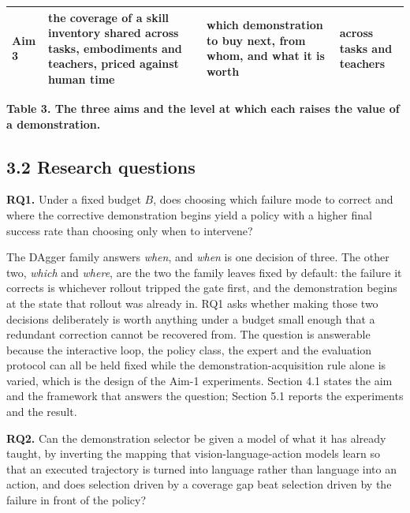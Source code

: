 \documentclass[
  11pt,
]{article}
\begin{document}
\begin{longtable}[]{@{}llll@{}}
\begin{minipage}[t]{0.06\columnwidth}\raggedright
Aim 3\strut
\end{minipage} & \begin{minipage}[t]{0.37\columnwidth}\raggedright
the coverage of a skill inventory shared across tasks, embodiments and
teachers, priced against human time\strut
\end{minipage} & \begin{minipage}[t]{0.28\columnwidth}\raggedright
which demonstration to buy next, from whom, and what it is worth\strut
\end{minipage} & \begin{minipage}[t]{0.16\columnwidth}\raggedright
across tasks and teachers\strut
\end{minipage}\tabularnewline
\bottomrule
\end{longtable}

\textbf{Table 3. The three aims and the level at which each raises the
value of a demonstration.}

\hypertarget{research-questions}{%
\subsection{3.2 Research questions}\label{research-questions}}

\textbf{RQ1.} Under a fixed budget \(B\), does choosing which failure
mode to correct and where the corrective demonstration begins yield a
policy with a higher final success rate than choosing only when to
intervene?

The DAgger family answers \emph{when}, and \emph{when} is one decision
of three. The other two, \emph{which} and \emph{where}, are the two the
family leaves fixed by default: the failure it corrects is whichever
rollout tripped the gate first, and the demonstration begins at the
state that rollout was already in. RQ1 asks whether making those two
decisions deliberately is worth anything under a budget small enough
that a redundant correction cannot be recovered from. The question is
answerable because the interactive loop, the policy class, the expert
and the evaluation protocol can all be held fixed while the
demonstration-acquisition rule alone is varied, which is the design of
the Aim-1 experiments. Section 4.1 states the aim and the framework that
answers the question; Section 5.1 reports the experiments and the
result.

\textbf{RQ2.} Can the demonstration selector be given a model of what it
has already taught, by inverting the mapping that vision-language-action
models learn so that an executed trajectory is turned into language
rather than language into an action, and does selection driven by a
coverage gap beat selection driven by the failure in front of the
policy?
\end{document}
